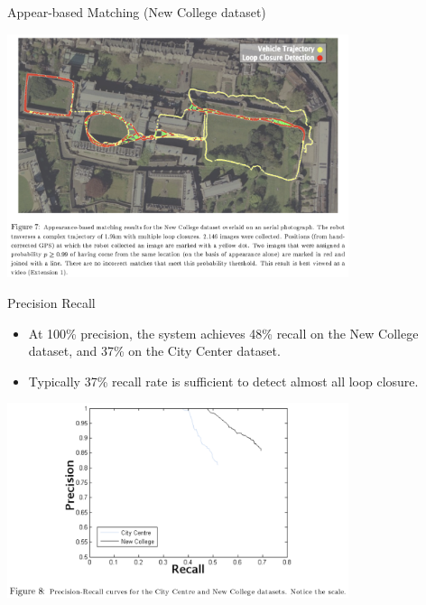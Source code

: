 \documentclass[dvipsnames, handout]{beamer}
\newcommand{\1}{\mathds{1}}	%
\begin{document}
\begin{frame}[t]{Appear-based Matching (New College dataset)}
\begin{center}
\includegraphics[width=0.75\textwidth]{imgs/fig7.png}
\end{center}
\end{frame}

\begin{frame}[t]{Precision Recall}
\begin{itemize}
\item At 100\% precision, the system achieves 48\% recall on the New College dataset, and 37\% on the City Center dataset. 
\item Typically 37\% recall rate is sufficient to detect almost all loop closure.
\end{itemize}

\begin{center}
\includegraphics[width=0.75\textwidth]{imgs/fig8.png}
\end{center}
\end{frame}
\end{document}
